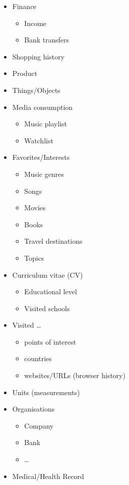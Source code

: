 \documentclass[12pt,english,a4paper,titlepage,cleardoublepage=empty,dottedtoc]{report}
\providecommand{\tightlist}{%
  \setlength{\itemsep}{0pt}\setlength{\parskip}{0pt}}
\begin{document}
\begin{itemize}
\tightlist
\item
  Finance

  \begin{itemize}
  \tightlist
  \item
    Income
  \item
    Bank transfers
  \end{itemize}
\item
  Shopping history
\item
  Product
\item
  Things/Objects
\item
  Media consumption

  \begin{itemize}
  \tightlist
  \item
    Music playlist
  \item
    Watchlist
  \end{itemize}
\item
  Favorites/Interests

  \begin{itemize}
  \tightlist
  \item
    Music genres
  \item
    Songs
  \item
    Movies
  \item
    Books
  \item
    Travel destinations
  \item
    Topics
  \end{itemize}
\item
  Curriculum vitae (CV)

  \begin{itemize}
  \tightlist
  \item
    Educational level
  \item
    Visited schools
  \end{itemize}
\item
  Visited \ldots{}

  \begin{itemize}
  \tightlist
  \item
    points of interest
  \item
    countries
  \item
    websites/URLs (browser history)
  \end{itemize}
\item
  Units (measurements)
\item
  Organisations

  \begin{itemize}
  \tightlist
  \item
    Company
  \item
    Bank
  \item
    \ldots{}
  \end{itemize}
\item
  Medical/Health Record


\end{itemize}
\end{document}
